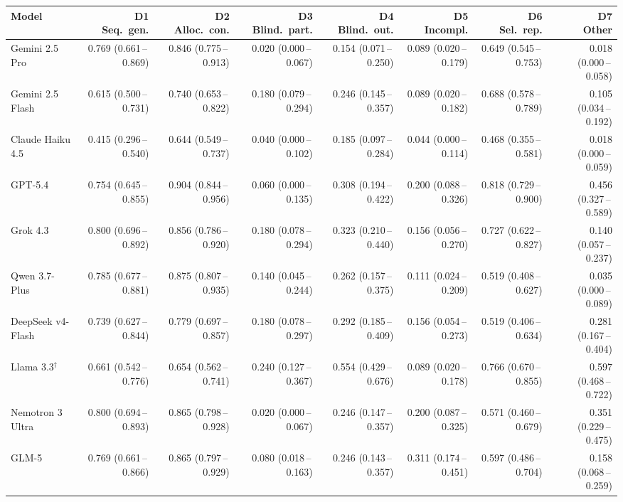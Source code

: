 \begin{tabular}{lrrrrrrr}
\toprule
Model & \makecell{D1\\Seq.\ gen.} & \makecell{D2\\Alloc.\ con.} & \makecell{D3\\Blind.\ part.} & \makecell{D4\\Blind.\ out.} & \makecell{D5\\Incompl.} & \makecell{D6\\Sel.\ rep.} & \makecell{D7\\Other} \\
\midrule
Gemini 2.5 Pro & 0.769 (0.661\,--\,0.869) & 0.846 (0.775\,--\,0.913) & 0.020 (0.000\,--\,0.067) & 0.154 (0.071\,--\,0.250) & 0.089 (0.020\,--\,0.179) & 0.649 (0.545\,--\,0.753) & 0.018 (0.000\,--\,0.058) \\
Gemini 2.5 Flash & 0.615 (0.500\,--\,0.731) & 0.740 (0.653\,--\,0.822) & 0.180 (0.079\,--\,0.294) & 0.246 (0.145\,--\,0.357) & 0.089 (0.020\,--\,0.182) & 0.688 (0.578\,--\,0.789) & 0.105 (0.034\,--\,0.192) \\
Claude Haiku 4.5 & 0.415 (0.296\,--\,0.540) & 0.644 (0.549\,--\,0.737) & 0.040 (0.000\,--\,0.102) & 0.185 (0.097\,--\,0.284) & 0.044 (0.000\,--\,0.114) & 0.468 (0.355\,--\,0.581) & 0.018 (0.000\,--\,0.059) \\
GPT-5.4 & 0.754 (0.645\,--\,0.855) & 0.904 (0.844\,--\,0.956) & 0.060 (0.000\,--\,0.135) & 0.308 (0.194\,--\,0.422) & 0.200 (0.088\,--\,0.326) & 0.818 (0.729\,--\,0.900) & 0.456 (0.327\,--\,0.589) \\
Grok 4.3 & 0.800 (0.696\,--\,0.892) & 0.856 (0.786\,--\,0.920) & 0.180 (0.078\,--\,0.294) & 0.323 (0.210\,--\,0.440) & 0.156 (0.056\,--\,0.270) & 0.727 (0.622\,--\,0.827) & 0.140 (0.057\,--\,0.237) \\
Qwen 3.7-Plus & 0.785 (0.677\,--\,0.881) & 0.875 (0.807\,--\,0.935) & 0.140 (0.045\,--\,0.244) & 0.262 (0.157\,--\,0.375) & 0.111 (0.024\,--\,0.209) & 0.519 (0.408\,--\,0.627) & 0.035 (0.000\,--\,0.089) \\
DeepSeek v4-Flash & 0.739 (0.627\,--\,0.844) & 0.779 (0.697\,--\,0.857) & 0.180 (0.078\,--\,0.297) & 0.292 (0.185\,--\,0.409) & 0.156 (0.054\,--\,0.273) & 0.519 (0.406\,--\,0.634) & 0.281 (0.167\,--\,0.404) \\
Llama 3.3$^\dagger$ & 0.661 (0.542\,--\,0.776) & 0.654 (0.562\,--\,0.741) & 0.240 (0.127\,--\,0.367) & 0.554 (0.429\,--\,0.676) & 0.089 (0.020\,--\,0.178) & 0.766 (0.670\,--\,0.855) & 0.597 (0.468\,--\,0.722) \\
Nemotron 3 Ultra & 0.800 (0.694\,--\,0.893) & 0.865 (0.798\,--\,0.928) & 0.020 (0.000\,--\,0.067) & 0.246 (0.147\,--\,0.357) & 0.200 (0.087\,--\,0.325) & 0.571 (0.460\,--\,0.679) & 0.351 (0.229\,--\,0.475) \\
GLM-5 & 0.769 (0.661\,--\,0.866) & 0.865 (0.797\,--\,0.929) & 0.080 (0.018\,--\,0.163) & 0.246 (0.143\,--\,0.357) & 0.311 (0.174\,--\,0.451) & 0.597 (0.486\,--\,0.704) & 0.158 (0.068\,--\,0.259) \\
\bottomrule
\end{tabular}